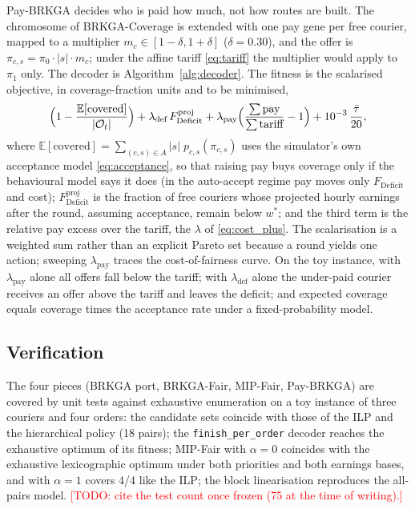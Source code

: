 \documentclass[preprint,12pt,authoryear]{elsarticle}%
\newcommand{\todo}[1]{\textcolor{red}{[TODO: #1]}}
\newcommand{\FD}{F_{\text{Deficit}}}
\newcommand{\E}{\mathbb{E}}
\DeclareMathOperator{\pay}{pay}
\begin{document}
Pay-BRKGA decides who is paid how much, not how routes are built. The chromosome of BRKGA-Coverage is extended with one pay gene per free courier, mapped to a multiplier $m_c \in [1-\delta, 1+\delta]$ ($\delta = 0.30$), and the offer is $\pi_{c,s} = \pi_0 \cdot |s| \cdot m_c$; under the affine tariff \eqref{eq:tariff} the multiplier would apply to $\pi_1$ only. The decoder is Algorithm~\ref{alg:decoder}. The fitness is the scalarised objective, in coverage-fraction units and to be minimised,
\begin{equation}
\Bigl(1 - \frac{\E[\text{covered}]}{|\mathcal{O}_t|}\Bigr)
+ \lambda_{\text{def}}\, \FD^{\text{proj}}
+ \lambda_{\text{pay}} \Bigl(\frac{\sum \pay}{\sum \text{tariff}} - 1\Bigr)
+ 10^{-3}\,\frac{\bar\tau}{20},
\label{eq:paybrkga}
\end{equation}
where $\E[\text{covered}] = \sum_{(c,s) \in A} |s|\; p_{c,s}(\pi_{c,s})$ uses the simulator's own acceptance model \eqref{eq:acceptance}, so that raising pay buys coverage only if the behavioural model says it does (in the auto-accept regime pay moves only $\FD$ and cost); $\FD^{\text{proj}}$ is the fraction of free couriers whose projected hourly earnings after the round, assuming acceptance, remain below $w^*$; and the third term is the relative pay excess over the tariff, the $\lambda$ of \eqref{eq:cost_plus}. The scalarisation is a weighted sum rather than an explicit Pareto set because a round yields one action; sweeping $\lambda_{\text{pay}}$ traces the cost-of-fairness curve. On the toy instance, with $\lambda_{\text{pay}}$ alone all offers fall below the tariff; with $\lambda_{\text{def}}$ alone the under-paid courier receives an offer above the tariff and leaves the deficit; and expected coverage equals coverage times the acceptance rate under a fixed-probability model.

\subsection{Verification}

The four pieces (BRKGA port, BRKGA-Fair, MIP-Fair, Pay-BRKGA) are covered by unit tests against exhaustive enumeration on a toy instance of three couriers and four orders: the candidate sets coincide with those of the ILP and the hierarchical policy (18 pairs); the \texttt{finish\_per\_order} decoder reaches the exhaustive optimum of its fitness; MIP-Fair with $\alpha = 0$ coincides with the exhaustive lexicographic optimum under both priorities and both earnings bases, and with $\alpha = 1$ covers 4/4 like the ILP; the block linearisation reproduces the all-pairs model. \todo{cite the test count once frozen (75 at the time of writing).}
\end{document}
